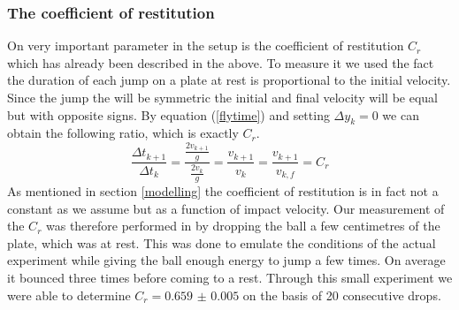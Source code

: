 \documentclass[12pt,oneside,a4paper]{article}
\numberwithin{equation}{section}
\begin{document}
{{{{\subsubsection{The coefficient of restitution}
On very important parameter in the setup is the coefficient of restitution $C_r$ which has already been described in the above. To measure it we used the fact the duration of each jump on a plate at rest is proportional to the initial velocity. Since the jump the will be symmetric the initial and final velocity will be equal but with opposite signs. By equation (\ref{flytime}) and setting $\Delta y_k=0$ we can obtain the following ratio, which is exactly $C_r$.
\begin{equation}
	\frac{\Delta t_{k+1}}{\Delta t_{k}}= \frac{\frac{2v_{k+1}}{g}}{\frac{2v_{k}}{g}} = \frac{v_{k+1}}{v_k} = \frac{v_{k+1}}{v_{k,f}} = C_r
\end{equation}
As mentioned in section \ref{modelling} the coefficient of restitution is in fact not a constant as we assume but as a function of impact velocity. Our measurement of the $C_r$ was therefore performed in by dropping the ball a few centimetres of the plate, which was at rest. This was done to emulate the conditions of the actual experiment while giving the ball enough energy to jump a few times. On average it bounced three times before coming to a rest. Through this small experiment we were able to determine $C_r= \num{0.659(5)}$ on the basis of 20 consecutive drops. 

}}}}
\end{document}
